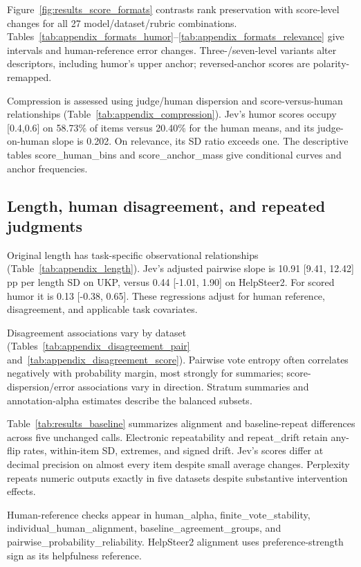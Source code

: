 \label{app:results_formats}

Figure~\ref{fig:results_score_formats} contrasts rank preservation with score-level changes for all 27 model/dataset/rubric combinations. Tables~\ref{tab:appendix_formats_humor}--\ref{tab:appendix_formats_relevance} give intervals and human-reference error changes. Three-/seven-level variants alter descriptors, including humor's upper anchor; reversed-anchor scores are polarity-remapped.

Compression is assessed using judge/human dispersion and score-versus-human relationships (Table~\ref{tab:appendix_compression}). Jev's humor scores occupy [0.4,0.6] on 58.73\% of items versus 20.40\% for the human means, and its judge-on-human slope is 0.202. On relevance, its SD ratio exceeds one. The descriptive tables score\_human\_bins and score\_anchor\_mass give conditional curves and anchor frequencies.

\subsection{Length, human disagreement, and repeated judgments}

\label{app:results_humans}

Original length has task-specific observational relationships (Table~\ref{tab:appendix_length}). Jev's adjusted pairwise slope is 10.91 [9.41, 12.42] pp per length SD on UKP, versus 0.44 [-1.01, 1.90] on HelpSteer2. For scored humor it is 0.13 [-0.38, 0.65]. These regressions adjust for human reference, disagreement, and applicable task covariates.

Disagreement associations vary by dataset (Tables~\ref{tab:appendix_disagreement_pair} and~\ref{tab:appendix_disagreement_score}). Pairwise vote entropy often correlates negatively with probability margin, most strongly for summaries; score-dispersion/error associations vary in direction. Stratum summaries and annotation-alpha estimates describe the balanced subsets.

Table~\ref{tab:results_baseline} summarizes alignment and baseline-repeat differences across five unchanged calls. Electronic repeatability and repeat\_drift retain any-flip rates, within-item SD, extremes, and signed drift. Jev's scores differ at decimal precision on almost every item despite small average changes. Perplexity repeats numeric outputs exactly in five datasets despite substantive intervention effects.

Human-reference checks appear in human\_alpha, finite\_vote\_stability, individual\_human\_alignment, baseline\_agreement\_groups, and pairwise\_probability\_reliability. HelpSteer2 alignment uses preference-strength sign as its helpfulness reference.

